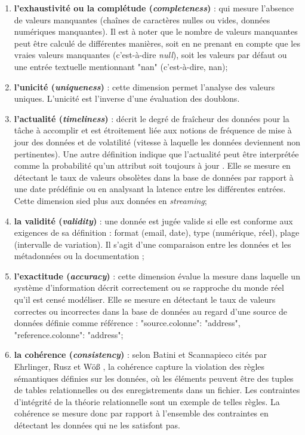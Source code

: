 \begin{enumerate}
\item \textbf{l'exhaustivité ou la complétude (\textit{completeness})} : qui mesure l'absence de valeurs manquantes (chaînes de caractères nulles ou vides, donn\'ees  num\'eriques manquantes). Il est à noter que le nombre de valeurs manquantes peut être calculé de différentes manières, soit en ne prenant en compte que les vraies valeurs manquantes (c'est-\`a-dire \textit{null}), soit les valeurs par défaut ou une entrée textuelle mentionnant "\acrshort{nan}" (c'est-à-dire, \acrlong{nan});

\item \textbf{l'unicité (\textit{uniqueness})} : cette dimension permet l'analyse des valeurs uniques. L'unicité est l'inverse d'une évaluation des doublons. %

\item \textbf{l'actualité (\textit{timeliness})} :  décrit le degré de fra\^icheur des données pour la tâche à accomplir et est étroitement liée aux notions de fréquence de mise à jour des données  et de volatilité (vitesse à laquelle les données deviennent non pertinentes). Une autre définition indique que l'actualité peut être interprétée comme la probabilité qu'un attribut soit toujours à jour \cite{ehrlinger2019survey}. Elle se mesure en détectant le taux de valeurs obsolètes dans la base de données par rapport à une date prédéfinie ou en analysant la latence entre les diff\'erentes entr\'ees. Cette dimension sied plus aux donn\'ees en \textit{streaming};

\item \textbf{la validité (\textit{validity})} : une donnée est jug\'ee valide si elle est conforme aux exigences de sa définition : format (email, date), type (num\'erique, r\'eel), plage (intervalle de variation). Il s'agit d'une comparaison entre les données et les métadonnées ou la documentation ; 


\item \textbf{l'exactitude (\textit{accuracy})} : cette dimension \'evalue la mesure dans laquelle un syst\`eme d'information décrit correctement ou se rapproche du monde réel qu'il est censé modéliser. Elle se mesure en d\'etectant le taux de valeurs correctes ou incorrectes dans la base de données au regard d'une source de donn\'ees d\'efinie comme r\'ef\'erence : "source.colonne": "address", "reference.colonne": "address";

\item \textbf{la cohérence (\textit{consistency})} : selon Batini et Scannapieco cit\'es par Ehrlinger, Rusz et Wöß \cite{ehrlinger2019survey} , la cohérence capture la violation des règles sémantiques définies sur les données, où les éléments peuvent être des tuples de tables relationnelles ou des enregistrements dans un fichier. Les contraintes d'intégrité de la théorie relationnelle sont un exemple de telles règles. La coh\'erence se mesure donc par rapport \`a l'ensemble des contraintes en d\'etectant les donn\'ees qui ne les satisfont pas. 


\end{enumerate}
